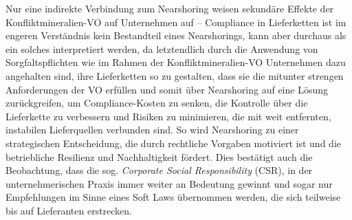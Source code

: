 \documentclass[12pt,a4paper,oneside]{book} %
\begin{document}
Nur eine indirekte Verbindung zum Nearshoring weisen sekundäre Effekte der Konfliktmineralien-VO auf Unternehmen auf -- Compliance in Lieferketten ist im engeren Verständnis kein Bestandteil eines Nearshorings, kann aber durchaus als ein solches interpretiert werden, da letztendlich durch die Anwendung von Sorgfaltspflichten wie im Rahmen der Konfliktmineralien-VO Unternehmen dazu angehalten sind, ihre Lieferketten so zu gestalten, dass sie die mitunter strengen Anforderungen der VO erfüllen und somit über Nearshoring auf eine Lösung zurückgreifen, um Compliance-Kosten zu senken, die Kontrolle über die Lieferkette zu verbessern und Risiken zu minimieren, die mit weit entfernten, instabilen Lieferquellen verbunden sind. So wird Nearshoring zu einer strategischen Entscheidung, die durch rechtliche Vorgaben motiviert ist und die betriebliche Resilienz und Nachhaltigkeit fördert. Dies bestätigt auch die Beobachtung, dass die sog. \textit{Corporate Social Responsibility} (CSR), in der unternehmerischen Praxis immer weiter an Bedeutung gewinnt und sogar nur Empfehlungen im Sinne eines Soft Laws übernommen werden, die sich teilweise bis auf Lieferanten erstrecken.\autocite[39]{teicke_gesetzliche_2018}
\end{document}
